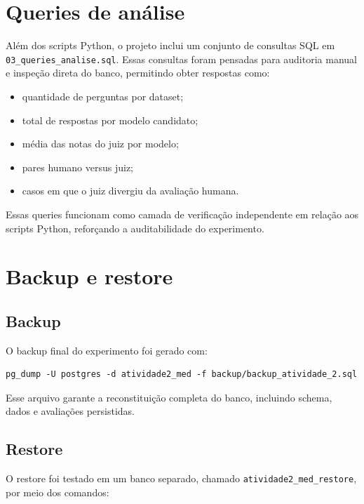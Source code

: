 \documentclass[12pt,a4paper]{article}
\begin{document}
\section{Queries de análise}

Além dos scripts Python, o projeto inclui um conjunto de consultas SQL em \texttt{03\_queries\_analise.sql}. Essas consultas foram pensadas para auditoria manual e inspeção direta do banco, permitindo obter respostas como:

\begin{itemize}[leftmargin=1.2cm]
    \item quantidade de perguntas por dataset;
    \item total de respostas por modelo candidato;
    \item média das notas do juiz por modelo;
    \item pares humano versus juiz;
    \item casos em que o juiz divergiu da avaliação humana. 
\end{itemize}

Essas queries funcionam como camada de verificação independente em relação aos scripts Python, reforçando a auditabilidade do experimento.

\section{Backup e restore}

\subsection{Backup}

O backup final do experimento foi gerado com:

\begin{lstlisting}[caption={Geracao do backup final}]
pg_dump -U postgres -d atividade2_med -f backup/backup_atividade_2.sql
\end{lstlisting}

Esse arquivo garante a reconstituição completa do banco, incluindo schema, dados e avaliações persistidas.

\subsection{Restore}

O restore foi testado em um banco separado, chamado \texttt{atividade2\_med\_restore}, por meio dos comandos:
\end{document}
